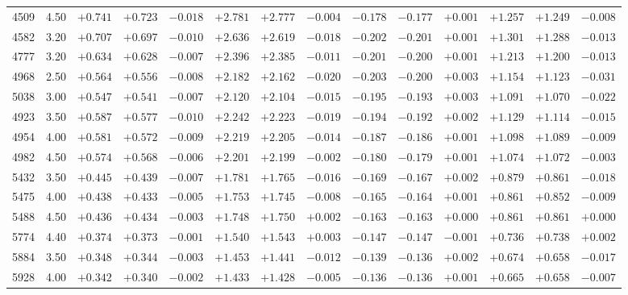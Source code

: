 \documentclass[]{aa}
\begin{document}
\begin{appendix}
\begin{table*}
\begin{center}
\begin{tabular}{llllllllllllll}
4509  &4.50 &$ +0.741$ &$ +0.723$ &$ -0.018$ &$ +2.781$ &$ +2.777$ &$ -0.004$ &$ -0.178$ &$ -0.177$ &$ +0.001$ &$ +1.257$ &$ +1.249$ &$ -0.008$\\
4582  &3.20 &$ +0.707$ &$ +0.697$ &$ -0.010$ &$ +2.636$ &$ +2.619$ &$ -0.018$ &$ -0.202$ &$ -0.201$ &$ +0.001$ &$ +1.301$ &$ +1.288$ &$ -0.013$\\
4777  &3.20 &$ +0.634$ &$ +0.628$ &$ -0.007$ &$ +2.396$ &$ +2.385$ &$ -0.011$ &$ -0.201$ &$ -0.200$ &$ +0.001$ &$ +1.213$ &$ +1.200$ &$ -0.013$\\
4968  &2.50 &$ +0.564$ &$ +0.556$ &$ -0.008$ &$ +2.182$ &$ +2.162$ &$ -0.020$ &$ -0.203$ &$ -0.200$ &$ +0.003$ &$ +1.154$ &$ +1.123$ &$ -0.031$\\
5038  &3.00 &$ +0.547$ &$ +0.541$ &$ -0.007$ &$ +2.120$ &$ +2.104$ &$ -0.015$ &$ -0.195$ &$ -0.193$ &$ +0.003$ &$ +1.091$ &$ +1.070$ &$ -0.022$\\
4923  &3.50 &$ +0.587$ &$ +0.577$ &$ -0.010$ &$ +2.242$ &$ +2.223$ &$ -0.019$ &$ -0.194$ &$ -0.192$ &$ +0.002$ &$ +1.129$ &$ +1.114$ &$ -0.015$\\
4954  &4.00 &$ +0.581$ &$ +0.572$ &$ -0.009$ &$ +2.219$ &$ +2.205$ &$ -0.014$ &$ -0.187$ &$ -0.186$ &$ +0.001$ &$ +1.098$ &$ +1.089$ &$ -0.009$\\
4982  &4.50 &$ +0.574$ &$ +0.568$ &$ -0.006$ &$ +2.201$ &$ +2.199$ &$ -0.002$ &$ -0.180$ &$ -0.179$ &$ +0.001$ &$ +1.074$ &$ +1.072$ &$ -0.003$\\
5432  &3.50 &$ +0.445$ &$ +0.439$ &$ -0.007$ &$ +1.781$ &$ +1.765$ &$ -0.016$ &$ -0.169$ &$ -0.167$ &$ +0.002$ &$ +0.879$ &$ +0.861$ &$ -0.018$\\
5475  &4.00 &$ +0.438$ &$ +0.433$ &$ -0.005$ &$ +1.753$ &$ +1.745$ &$ -0.008$ &$ -0.165$ &$ -0.164$ &$ +0.001$ &$ +0.861$ &$ +0.852$ &$ -0.009$\\
5488  &4.50 &$ +0.436$ &$ +0.434$ &$ -0.003$ &$ +1.748$ &$ +1.750$ &$ +0.002$ &$ -0.163$ &$ -0.163$ &$ +0.000$ &$ +0.861$ &$ +0.861$ &$ +0.000$\\
5774  &4.40 &$ +0.374$ &$ +0.373$ &$ -0.001$ &$ +1.540$ &$ +1.543$ &$ +0.003$ &$ -0.147$ &$ -0.147$ &$ -0.001$ &$ +0.736$ &$ +0.738$ &$ +0.002$\\
5884  &3.50 &$ +0.348$ &$ +0.344$ &$ -0.003$ &$ +1.453$ &$ +1.441$ &$ -0.012$ &$ -0.139$ &$ -0.136$ &$ +0.002$ &$ +0.674$ &$ +0.658$ &$ -0.017$\\
5928  &4.00 &$ +0.342$ &$ +0.340$ &$ -0.002$ &$ +1.433$ &$ +1.428$ &$ -0.005$ &$ -0.136$ &$ -0.136$ &$ +0.001$ &$ +0.665$ &$ +0.658$ &$ -0.007$\\

\end{tabular}
\end{center}
\end{table*}
\end{appendix}
\end{document}
